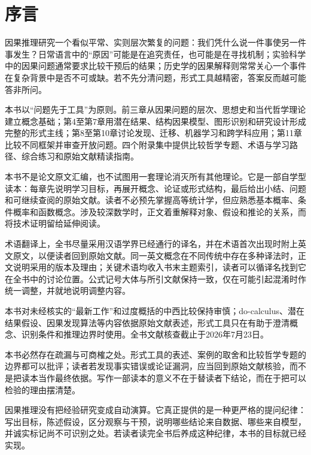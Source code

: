 \chapter*{序言}

因果推理研究一个看似平常、实则层次繁复的问题：我们凭什么说一件事使另一件事发生？日常语言中的“原因”可能是在追究责任，也可能是在寻找机制；实验科学中的因果问题通常要求比较干预后的结果；历史学的因果解释则常常关心一个事件在复杂背景中是否不可或缺。若不先分清问题，形式工具越精密，答案反而越可能答非所问。

本书以“问题先于工具”为原则。前三章从因果问题的层次、思想史和当代哲学理论建立概念基础；第4至第7章用潜在结果、结构因果模型、图形识别和研究设计形成完整的形式主线；第8至第10章讨论发现、迁移、机器学习和跨学科应用；第11章比较不同框架并审查开放问题。四个附录集中提供比较哲学专题、术语与学习路径、综合练习和原始文献精读指南。

本书不是论文原文汇编，也不试图用一套理论消灭所有其他理论。它是一部自学型读本：每章先说明学习目标，再展开概念、论证或形式结构，最后给出小结、问题和可继续查阅的原始文献。读者不必预先掌握高等统计学，但应熟悉基本概率、条件概率和函数概念。涉及较深数学时，正文着重解释对象、假设和推论的关系，而将技术证明留给延伸阅读。

术语翻译上，全书尽量采用汉语学界已经通行的译名，并在术语首次出现时附上英文原文，以便读者回到原始文献。同一英文概念在不同传统中存在多种译法时，正文说明采用的版本及理由；关键术语均收入书末主题索引，读者可以循译名找到它在全书中的讨论位置。公式记号大体与所引文献保持一致，仅在可能引起混淆时作统一调整，并就地说明调整内容。

本书对未经核实的“最新工作”和过度概括的中西比较保持审慎；do-calculus、潜在结果假设、因果发现算法等内容依据原始文献表述，形式工具只在有助于澄清概念、识别条件和推理边界时使用。全书文献核查截止于2026年7月23日。

本书必然存在疏漏与可商榷之处。形式工具的表述、案例的取舍和比较哲学专题的边界都可以批评；读者若发现事实错误或论证漏洞，应当回到原始文献核验，而不是把读本当作最终依据。写作一部读本的意义不在于替读者下结论，而在于把可以检验的理由摆清楚。

因果推理没有把经验研究变成自动演算。它真正提供的是一种更严格的提问纪律：写出目标，陈述假设，区分观察与干预，说明哪些结论来自数据、哪些来自模型，并诚实标记尚不可识别之处。若读者读完全书后养成这种纪律，本书的目标就已经实现。

